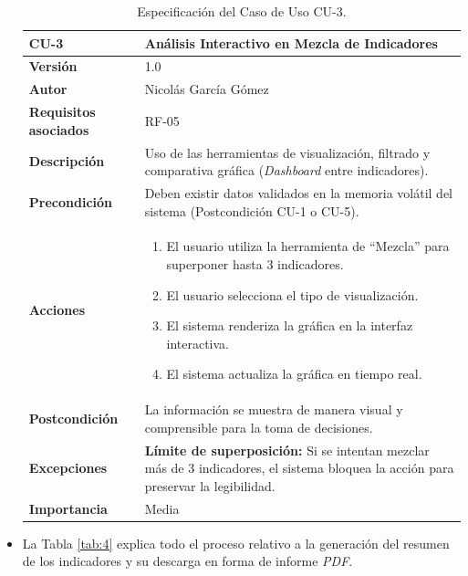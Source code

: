 \begin{itemize}
\begin{table}[hbt!]	\centering
	\begin{tabularx}{\linewidth}{ p{} p{} }
		\toprule
		\textbf{CU-3}    & \textbf{Análisis Interactivo en Mezcla de Indicadores}\\
		\toprule
		\textbf{Versión}              & 1.0    \\
		\textbf{Autor}                & Nicolás García Gómez \\
		\textbf{Requisitos asociados} & RF-05 \\
		\textbf{Descripción}          & Uso de las herramientas de visualización, filtrado y comparativa gráfica (\textit{Dashboard} entre indicadores). \\
		\textbf{Precondición}         & Deben existir datos validados en la memoria volátil del sistema (Postcondición CU-1 o CU-5). \\
		\textbf{Acciones}             &
		\begin{enumerate}
			\def\labelenumi{\arabic{enumi}.}
			\item El usuario utiliza la herramienta de ``Mezcla'' para superponer hasta 3 indicadores.
			\item El usuario selecciona el tipo de visualización.
			\item El sistema renderiza la gráfica en la interfaz interactiva.
			\item El sistema actualiza la gráfica en tiempo real.
		\end{enumerate}\\
		\textbf{Postcondición}        & La información se muestra de manera visual y comprensible para la toma de decisiones. \\
		\textbf{Excepciones}          & \textbf{Límite de superposición:} Si se intentan mezclar más de 3 indicadores, el sistema bloquea la acción para preservar la legibilidad. \\
		\textbf{Importancia}          & Media \\
		\bottomrule
	\end{tabularx}
	\caption{Especificación del Caso de Uso CU-3.}
	\label{tab:3}
\end{table}	
	
	\item La Tabla \ref{tab:4} explica todo el proceso relativo a la generación del resumen de los indicadores y su descarga en forma de informe \textit{PDF}.
	

\end{itemize}
